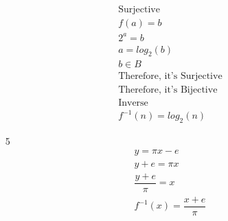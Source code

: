 \documentclass[12pt]{article}
\begin{document}
\begin{enumerate}
\begin{equation*}
\begin{split}
		    \text{Surjective}\\
		    f(a) = b\\
		    2^a = b\\
		    a = log_2(b)\\
		    b \in B\\
		    \text{Therefore, it's Surjective}\\
		    \text{Therefore, it's Bijective}\\
		    \text{Inverse}\\
		    f^{-1}(n) = log_2(n) 
	    	\end{split}
	    \end{equation*}
	\item [5]
	    \begin{equation*}
	    	\begin{split}
	    	    y=\pi x - e\\
		    y+e = \pi x\\
		    \dfrac{y+e}{\pi} = x\\
		    f^{-1}(x) = \dfrac{x+e}{\pi}
	    	\end{split}
	    \end{equation*}
\end{enumerate}
\end{document}
